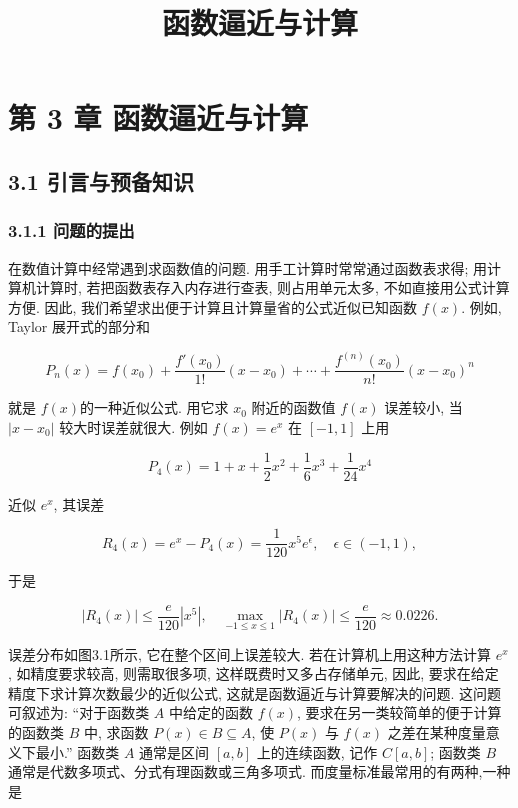\documentclass[
  10pt,
  fontset=fandol]{ctexart}
\title{函数逼近与计算}
\author{}
\date{}
\begin{document}
\maketitle

\section{第 3 章 函数逼近与计算}\label{ux7b2c-3-ux7ae0-ux51fdux6570ux903cux8fd1ux4e0eux8ba1ux7b97}

\subsection{3.1 引言与预备知识}\label{ux5f15ux8a00ux4e0eux9884ux5907ux77e5ux8bc6}

\subsubsection{3.1.1 问题的提出}\label{ux95eeux9898ux7684ux63d0ux51fa}

在数值计算中经常遇到求函数值的问题. 用手工计算时常常通过函数表求得; 用计算机计算时, 若把函数表存入内存进行查表, 则占用单元太多, 不如直接用公式计算方便. 因此, 我们希望求出便于计算且计算量省的公式近似已知函数 \(f(x)\). 例如, Taylor 展开式的部分和

\[
P_n(x) = f(x_0) + \frac{f'(x_0)}{1!}(x-x_0) + \cdots + \frac{f^{(n)}(x_0)}{n!}(x-x_0)^n \tag{3.1.1}
\]

就是 \(f(x)\)的一种近似公式. 用它求 \(x_0\) 附近的函数值 \(f(x)\) 误差较小, 当 \(|x-x_0|\) 较大时误差就很大. 例如 \(f(x)=e^x\) 在 \([-1,1]\) 上用

\[
P_4(x) = 1+x+\frac{1}{2}x^2+\frac{1}{6}x^3+\frac{1}{24}x^4
\]

近似 \(e^x\), 其误差

\[
R_4(x)=e^x-P_4(x)=\frac{1}{120}x^5e^\epsilon, \quad \epsilon \in(-1,1),
\]

于是

\[
|R_4(x)| \leqslant \frac{e}{120}|x^5|, \quad \max_{-1 \leqslant x \leqslant 1}|R_4(x)| \leqslant \frac{e}{120} \approx 0.0226.
\]

误差分布如图3.1所示, 它在整个区间上误差较大. 若在计算机上用这种方法计算 \(e^x\), 如精度要求较高, 则需取很多项, 这样既费时又多占存储单元, 因此, 要求在给定精度下求计算次数最少的近似公式, 这就是函数逼近与计算要解决的问题. 这问题可叙述为: ``对于函数类 \(A\) 中给定的函数 \(f(x)\), 要求在另一类较简单的便于计算的函数类 \(B\) 中, 求函数 \(P(x) \in B \subseteq A\), 使 \(P(x)\) 与 \(f(x)\) 之差在某种度量意义下最小.'' 函数类 \(A\) 通常是区间 \([a,b]\) 上的连续函数, 记作 \(C[a,b]\); 函数类 \(B\) 通常是代数多项式、分式有理函数或三角多项式. 而度量标准最常用的有两种,一种是
\end{document}

